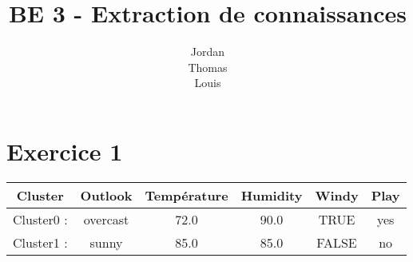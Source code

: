 \documentclass[a4paper, 11pt]{report}
\begin{document}
	\title{BE 3 - Extraction de connaissances}
	\author{Jordan \\ Thomas \\ Louis }

	\maketitle

	\paragraph{}
		\lipsum[1-3]

\section{Exercice 1}
\begin{table}
	\begin{tabular}{|c|c|c|c|c|c|}
		\hline
		Cluster & Outlook & Température & Humidity & Windy & Play \\
		\hline
		Cluster0 : & overcast & 72.0 & 90.0 & TRUE & yes \\
		\hline
		Cluster1 : & sunny & 85.0 & 85.0 & FALSE & no \\
		\hline
	\end{tabular}
\end{table}
\end{document}
